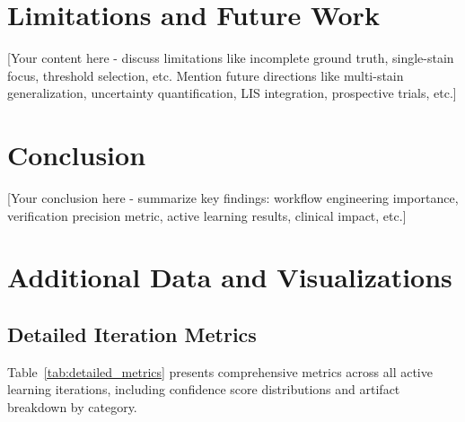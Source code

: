 \documentclass[conference]{IEEEtran}
\begin{document}
\section{Limitations and Future Work}

[Your content here - discuss limitations like incomplete ground truth, single-stain focus, threshold selection, etc. Mention future directions like multi-stain generalization, uncertainty quantification, LIS integration, prospective trials, etc.]

\section{Conclusion}

[Your conclusion here - summarize key findings: workflow engineering importance, verification precision metric, active learning results, clinical impact, etc.]





\appendix

\section{Additional Data and Visualizations}

\subsection{Detailed Iteration Metrics}

Table~\ref{tab:detailed_metrics} presents comprehensive metrics across all active learning iterations, including confidence score distributions and artifact breakdown by category.
\end{document}
